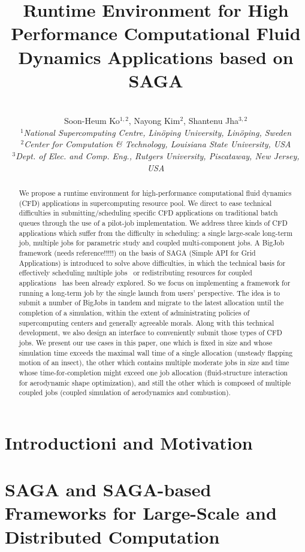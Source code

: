 \documentclass[10pt,conference]{IEEEtran}
\title{Runtime Environment for High Performance Computational Fluid Dynamics Applications based on SAGA}
\author{
 ~\\[-2em]
 Soon-Heum Ko$^{1,2}$, Nayong Kim$^{2}$, Shantenu Jha$^{3,2}$\\
 \small{\emph{$^{1}$National Supercomputing Centre, Lin\"{o}ping University, Lin\"{o}ping, Sweden}}\\
 \small{\emph{$^{2}$Center for Computation \& Technology, Louisiana State University, USA}}\\
 \small{\emph{$^{3}$Dept. of Elec. and Comp. Eng., Rutgers University, Piscataway, New Jersey, USA}}\\
}
\newcommand{\up}{\vspace*{-1em}}
\begin{document}
\maketitle

\begin{abstract}
We propose a runtime environment for high-performance computational
fluid dynamics (CFD) applications in supercomputing resource pool.
We direct to ease technical difficulties in submitting/scheduling
specific CFD applications on traditional batch queues through the use
of a pilot-job implementation. We address three kinds of CFD applications
which suffer from the difficulty in scheduling: a single large-scale
long-term job, multiple jobs for parametric study and coupled multi-component
jobs. A BigJob framework (needs reference!!!!!) on the basis of SAGA 
(Simple API for Grid Applications) is introduced to solve above difficulties,
in which the technical basis for effectively scheduling multiple jobs~\cite{SAGA_Thota}
or redistributing resources for coupled applications~\cite{CCGrid_Hybrid} 
has been already explored. So we focus on implementing a framework for running
a long-term job by the single launch from users' perspective. The idea is to
submit a number of BigJobs in tandem and migrate to the latest allocation
until the completion of a simulation, within the extent of administrating
policies of supercomputing centers and generally agreeable morals. Along with 
this technical development, we also design an interface to conveniently submit
those types of CFD jobs. We present our use cases in this paper, one which is
fixed in size and whose simulation time exceeds the maximal wall time of a single allocation 
(unsteady flapping motion of an insect), the other which contains multiple moderate jobs
in size and time whose time-for-completion might exceed one job allocation 
(fluid-structure interaction for aerodynamic shape optimization), and
still the other which is composed of multiple coupled jobs (coupled simulation of
aerodynamics and combustion).
\end{abstract}
\up\up

\section{Introductioni and Motivation}

\section{SAGA and SAGA-based Frameworks for Large-Scale and Distributed Computation}
\end{document}
